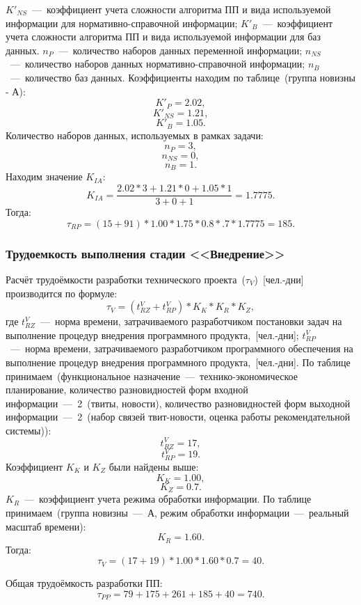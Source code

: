             $K'_{NS}$~---~коэффициент учета сложности алгоритма ПП и вида используемой информации для нормативно-справочной информации;
            $K'_B$~---~коэффициент учета сложности алгоритма ПП и вида используемой информации для баз данных.
            $n_P$~---~количество наборов данных переменной информации;
            $n_{NS}$~---~количество наборов данных нормативно-справочной информации;
            $n_B$~---~количество баз данных.
            Коэффициенты находим по таблице~(группа новизны - А):
            $$K'_P=2.02,$$
            $$K'_{NS}=1.21,$$
            $$K'_B=1.05.$$
            Количество наборов данных, используемых в рамках задачи:
            $$n_P=3,$$
            $$n_{NS}=0,$$
            $$n_B=1.$$
            Находим значение $K_{IA}$:
            $$K_{IA} = \dfrac{2.02*3+1.21*0+1.05*1}{3+0+1}=1.7775.$$
            Тогда:
            $$\tau_{RP} = (15+91)*1.00*1.75*0.8*.7*1.7775 = 185.$$

        \subsubsection{Трудоемкость выполнения стадии <<Внедрение>>}
            Расчёт трудоёмкости разработки технического проекта~($\tau_{V}$)~[чел.-дни] производится по формуле:
            $$\tau_{V} = (t^V_{RZ} + t^V_{RP})*K_K*K_R*K_Z,$$
            где $t^V_{RZ}$~---~норма времени, затрачиваемого разработчиком постановки задач на выполнение процедур внедрения программного продукта,~[чел.-дни];
            $t^V_{RP}$~---~норма времени, затрачиваемого разработчиком программного обеспечения на выполнение процедур внедрения программного продукта,~[чел.-дни].
            По таблице принимаем~(функциональное назначение~---~технико-экономическое планирование,
            количество разновидностей форм входной информации~---~2~(твиты, новости),
            количество разновидностей форм выходной информации~---~2~(набор связей твит-новости, оценка работы рекомендательной системы)):
            $$t^V_{RZ} = 17,$$
            $$t^V_{RP} = 19.$$
            Коэффициент $K_K$ и $K_Z$ были найдены выше:
            $$K_K=1.00,$$
            $$K_Z=0.7.$$
            $K_R$~---~коэффициент учета режима обработки информации. По таблице принимаем~(группа новизны~---~А, режим обработки информации~---~реальный масштаб времени):
            $$K_R = 1.60.$$
            Тогда:
            $$\tau_{V} = (17+19)*1.00*1.60*0.7= 40.$$

        Общая трудоёмкость разработки ПП:
        $$\tau_{PP} = 79+175+261+185+40= 740.$$

